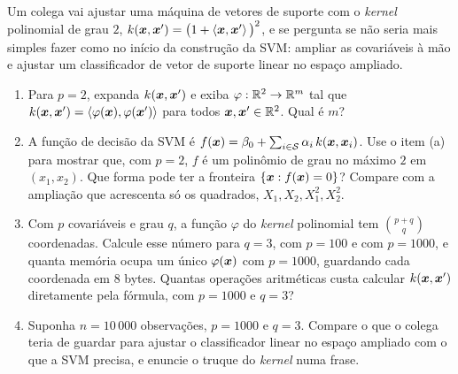 \documentclass[11pt,a4paper]{article}
\begin{document}
\begin{exercicio}
Um colega vai ajustar uma máquina de vetores de suporte com o \emph{kernel} polinomial
de grau $2$, $k(\bm{x},\bm{x}')=\big(1+\left\langle \bm{x}, \bm{x}' \right\rangle\big)^2$, e se pergunta se não seria
mais simples fazer como no início da construção da SVM: ampliar as covariáveis à mão e
ajustar um classificador de vetor de suporte linear no espaço ampliado.
\begin{enumerate}[label=(\alph*),leftmargin=1.1cm]
  \item Para $p=2$, expanda $k(\bm{x},\bm{x}')$ e exiba $\varphi:\mathbb{R}^2\to\mathbb{R}^m$ tal que
        $k(\bm{x},\bm{x}')=\left\langle \varphi(\bm{x}), \varphi(\bm{x}') \right\rangle$ para todos $\bm{x},\bm{x}'\in\mathbb{R}^2$.
        Qual é $m$?
  \item A função de decisão da SVM é
        $f(\bm{x})=\beta_0+\sum_{i\in\mathcal S}\alpha_i\,k(\bm{x},\bm{x}_i)$. Use o item (a)
        para mostrar que, com $p=2$, $f$ é um polinômio de grau no máximo $2$ em
        $(x_1,x_2)$. Que forma pode ter a fronteira $\{\bm{x}: f(\bm{x})=0\}$? Compare com a
        ampliação que acrescenta só os quadrados, $X_1,X_2,X_1^2,X_2^2$.
  \item Com $p$ covariáveis e grau $q$, a função $\varphi$ do \emph{kernel} polinomial
        tem $\binom{p+q}{q}$ coordenadas. Calcule esse número para $q=3$, com $p=100$
        e com $p=1000$, e quanta memória ocupa um único $\varphi(\bm{x})$ com $p=1000$,
        guardando cada coordenada em $8$ bytes. Quantas operações aritméticas custa
        calcular $k(\bm{x},\bm{x}')$ diretamente pela fórmula, com $p=1000$ e $q=3$?
  \item Suponha $n=10\,000$ observações, $p=1000$ e $q=3$. Compare o que o colega
        teria de guardar para ajustar o classificador linear no espaço ampliado com o
        que a SVM precisa, e enuncie o truque do \emph{kernel} numa frase.
\end{enumerate}
\end{exercicio}
\end{document}
